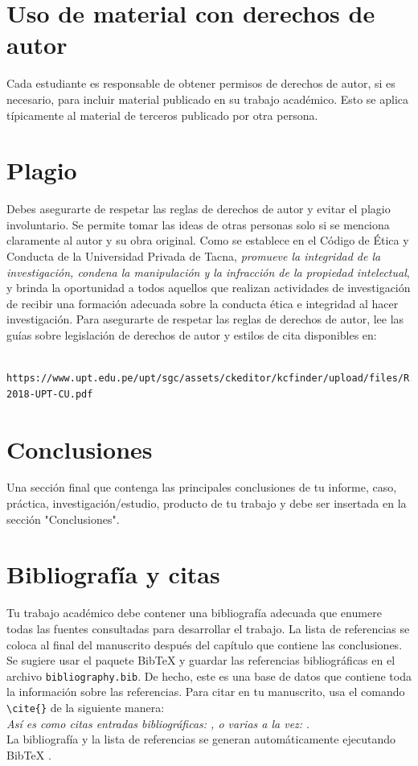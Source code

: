 \documentclass[11pt,a4paper]{article}
\begin{document}
\section{Uso de material con derechos de autor}

Cada estudiante es responsable de obtener permisos de derechos de autor, si es necesario, para incluir material publicado en su trabajo académico.
Esto se aplica típicamente al material de terceros publicado por otra persona.

\section{Plagio}

Debes asegurarte de respetar las reglas de derechos de autor y evitar el plagio involuntario.
Se permite tomar las ideas de otras personas solo si se menciona claramente al autor y su obra original.
Como se establece en el Código de Ética y Conducta de la Universidad Privada de Tacna, \textit{promueve la integridad de la investigación,
condena la manipulación y la infracción de la propiedad intelectual}, y brinda la oportunidad a todos aquellos
que realizan actividades de investigación de recibir una formación adecuada sobre la conducta ética e integridad al hacer investigación.
Para asegurarte de respetar las reglas de derechos de autor, lee las guías sobre legislación de derechos de autor y estilos de cita disponibles en:
\begin{verbatim}
    https://www.upt.edu.pe/upt/sgc/assets/ckeditor/kcfinder/upload/files/R.162-2018-UPT-CU.pdf
\end{verbatim}

\section{Conclusiones}
\color{black}
Una sección final que contenga las principales conclusiones de tu informe, caso, práctica, investigación/estudio, producto de tu trabajo y debe ser insertada en la sección "Conclusiones".

\section{Bibliografía y citas}
Tu trabajo académico debe contener una bibliografía adecuada que enumere todas las fuentes consultadas para desarrollar el trabajo.
La lista de referencias se coloca al final del manuscrito después del capítulo que contiene las conclusiones.
Se sugiere usar el paquete BibTeX y guardar las referencias bibliográficas en el archivo \verb|bibliography.bib|.
De hecho, este es una base de datos que contiene toda la información sobre las referencias. Para citar en tu manuscrito, usa el comando \verb|\cite{}| de la siguiente manera:
\\
\textit{Así es como citas entradas bibliográficas: \cite{knuth74}, o varias a la vez: \cite{knuth92,lamport94}}.
\\
La bibliografía y la lista de referencias se generan automáticamente ejecutando BibTeX \cite{bibtex}.
\end{document}
